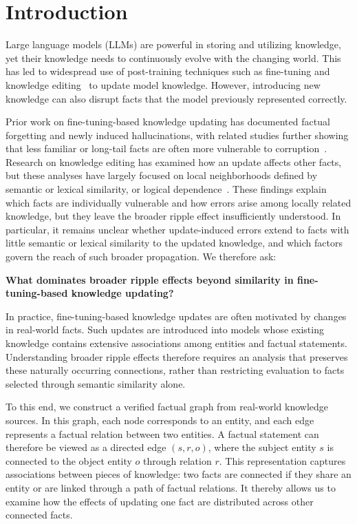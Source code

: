 \section{Introduction}
Large language models (LLMs) are powerful in storing and utilizing knowledge, yet their knowledge needs to continuously evolve with the changing world. This has led to widespread use of post-training techniques such as fine-tuning and knowledge editing~\cite{zhu2020modifying, hu2021lora, gekhman2024doesfinetuningllmsnew, meng2022rome, yao2023editing, thede2025wikibigeditunderstandinglimitslifelong} to update model knowledge. However, introducing new knowledge can also disrupt facts that the model previously represented correctly. 

Prior work on fine-tuning-based knowledge updating has documented factual forgetting and newly induced hallucinations, with related studies further showing that less familiar or long-tail facts are often more vulnerable to corruption~\cite{gekhman2024doesfinetuningllmsnew, luo2025empiricalstudycatastrophicforgetting, kandpal2023longtail, mallen2023not}. Research on knowledge editing has examined how an update affects other facts, but these analyses have largely focused on local neighborhoods defined by semantic or lexical similarity, or logical dependence~\cite{cohen2023ripple, qin2025doesnewknowledgecreate, hua2024propagationpitfallsreasoningbasedassessment, gupta2024modeleditingscaleleads, gu2024modeleditingharmsgeneral}. These findings explain which facts are individually vulnerable and how errors arise among locally related knowledge, but they leave the broader ripple effect insufficiently understood. In particular, it remains unclear whether update-induced errors extend to facts with little semantic or lexical similarity to the updated knowledge, and which factors govern the reach of such broader propagation. We therefore ask:

\textbf{What dominates broader ripple effects beyond similarity in fine-tuning-based knowledge updating?}


In practice, fine-tuning-based knowledge updates are often motivated by changes in real-world facts. Such updates are introduced into models whose existing knowledge contains extensive associations among entities and factual statements. Understanding broader ripple effects therefore requires an analysis that preserves these naturally occurring connections, rather than restricting evaluation to facts selected through semantic similarity alone.

To this end, we construct a verified factual graph from real-world knowledge sources. In this graph, each node corresponds to an entity, and each edge represents a factual relation between two entities. A factual statement can therefore be viewed as a directed edge $(s,r,o)$, where the subject entity $s$ is connected to the object entity $o$ through relation $r$. This representation captures associations between pieces of knowledge: two facts are connected if they share an entity or are linked through a path of factual relations. It thereby allows us to examine how the effects of updating one fact are distributed across other connected facts.

